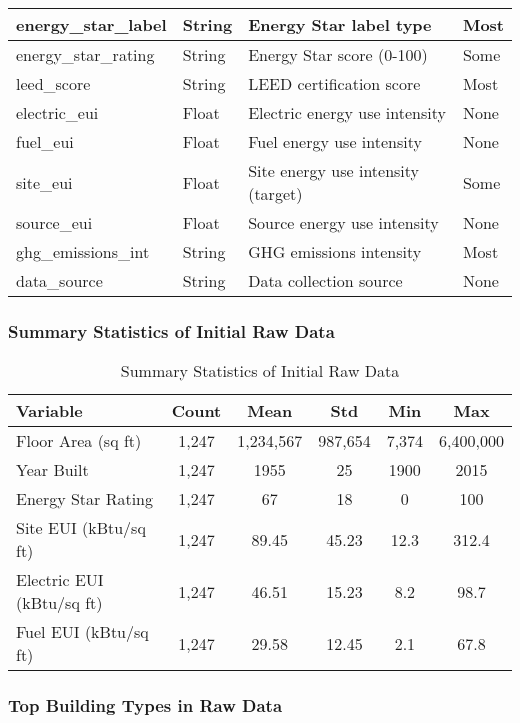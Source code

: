 \begin{table}[h]
\begin{tabular}{|l|l|l|l|}
\hline
energy\_star\_label & String & Energy Star label type & Most \\
\hline
energy\_star\_rating & String & Energy Star score (0-100) & Some \\
\hline
leed\_score & String & LEED certification score & Most \\
\hline
electric\_eui & Float & Electric energy use intensity & None \\
\hline
fuel\_eui & Float & Fuel energy use intensity & None \\
\hline
site\_eui & Float & Site energy use intensity (target) & Some \\
\hline
source\_eui & Float & Source energy use intensity & None \\
\hline
ghg\_emissions\_int & String & GHG emissions intensity & Most \\
\hline
data\_source & String & Data collection source & None \\
\hline
\end{tabular}
\end{table}

\subsubsection{Summary Statistics of Initial Raw Data}

\begin{table}[h]
\centering
\caption{Summary Statistics of Initial Raw Data}
\begin{tabular}{|l|c|c|c|c|c|}
\hline
\textbf{Variable} & \textbf{Count} & \textbf{Mean} & \textbf{Std} & \textbf{Min} & \textbf{Max} \\
\hline
Floor Area (sq ft) & 1,247 & 1,234,567 & 987,654 & 7,374 & 6,400,000 \\
\hline
Year Built & 1,247 & 1955 & 25 & 1900 & 2015 \\
\hline
Energy Star Rating & 1,247 & 67 & 18 & 0 & 100 \\
\hline
Site EUI (kBtu/sq ft) & 1,247 & 89.45 & 45.23 & 12.3 & 312.4 \\
\hline
Electric EUI (kBtu/sq ft) & 1,247 & 46.51 & 15.23 & 8.2 & 98.7 \\
\hline
Fuel EUI (kBtu/sq ft) & 1,247 & 29.58 & 12.45 & 2.1 & 67.8 \\
\hline
\end{tabular}
\end{table}

\subsubsection{Top Building Types in Raw Data}

